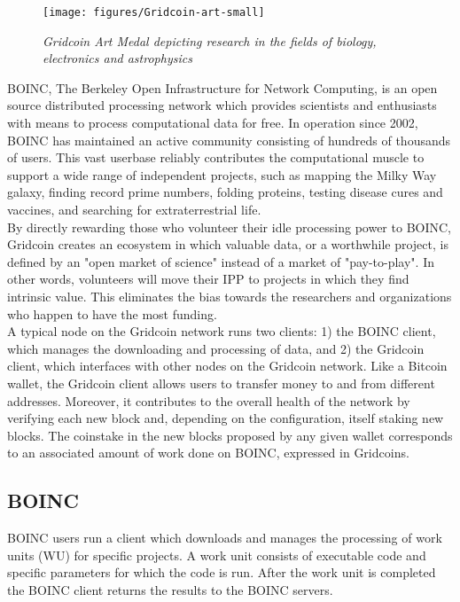 \begin{figure}
\centering
\texttt{[image: figures/Gridcoin-art-small]}
\medskip
\caption{\textit{Gridcoin Art Medal depicting research in the fields of biology, electronics and astrophysics}}
\small
\end{figure}

BOINC, The Berkeley Open Infrastructure for Network Computing, is an open source distributed processing network which provides scientists and enthusiasts with means to process computational data for free. In operation since 2002, BOINC has maintained an active community consisting of hundreds of thousands of users. This vast userbase reliably contributes the computational muscle to support a wide range of independent projects, such as mapping the Milky Way galaxy, finding record prime numbers, folding proteins, testing disease cures and vaccines, and searching for extraterrestrial life.\\

By directly rewarding those who volunteer their idle processing power to BOINC, Gridcoin creates an ecosystem in which valuable data, or a worthwhile project, is defined by an "open market of science" instead of a market of "pay-to-play".  In other words, volunteers will move their IPP to projects in which they find intrinsic value. This eliminates the bias towards the researchers and organizations who happen to have the most funding.\\

A typical node on the Gridcoin network runs two clients: 1) the BOINC client, which manages the downloading and processing of data, and 2) the Gridcoin client, which interfaces with other nodes on the Gridcoin network. Like a Bitcoin wallet, the Gridcoin client allows users to transfer money to and from different addresses. Moreover, it contributes to the overall health of the network by verifying each new block and, depending on the configuration, itself staking new blocks. The coinstake in the new blocks proposed by any given wallet corresponds to an associated amount of work done on BOINC, expressed in Gridcoins.\\

\subsection{BOINC}

BOINC users run a client which downloads and manages the processing of work units (WU) for specific projects. A work unit consists of executable code and specific parameters for which the code is run.  After the work unit is completed the BOINC client returns the results to the BOINC servers.

